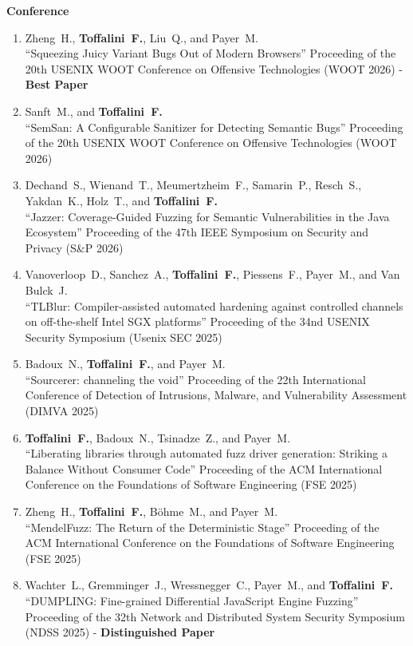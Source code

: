\textbf{Conference}\begin{enumerate}[leftmargin=5mm]
\item[C20] Zheng~H., \textbf{Toffalini~F.}, Liu~Q., and Payer~M.\\``Squeezing Juicy Variant Bugs Out of Modern Browsers'' Proceeding of the 20th USENIX WOOT Conference on Offensive Technologies (WOOT 2026)  - \textbf{Best Paper}
\item[C19] Sanft~M., and \textbf{Toffalini~F.}\\``SemSan: A Configurable Sanitizer for Detecting Semantic Bugs'' Proceeding of the 20th USENIX WOOT Conference on Offensive Technologies (WOOT 2026) 
\item[C18] Dechand~S., Wienand~T., Meumertzheim~F., Samarin~P., Resch~S., Yakdan~K., Holz~T., and \textbf{Toffalini~F.}\\``Jazzer: Coverage-Guided Fuzzing for Semantic Vulnerabilities in the Java Ecosystem'' Proceeding of the 47th IEEE Symposium on Security and Privacy (S\&P 2026) 
\item[C17] Vanoverloop~D., Sanchez~A., \textbf{Toffalini~F.}, Piessens~F., Payer~M., and Van Bulck~J.\\``TLBlur: Compiler-assisted automated hardening against controlled channels on off-the-shelf Intel SGX platforms'' Proceeding of the 34nd USENIX Security Symposium (Usenix SEC 2025) 
\item[C16] Badoux~N., \textbf{Toffalini~F.}, and Payer~M.\\``Sourcerer: channeling the void'' Proceeding of the 22th International Conference of Detection of Intrusions, Malware, and Vulnerability Assessment (DIMVA 2025) 
\item[C15] \textbf{Toffalini~F.}, Badoux~N., Tsinadze~Z., and Payer~M.\\``Liberating libraries through automated fuzz driver generation: Striking a Balance Without Consumer Code'' Proceeding of the ACM International Conference on the Foundations of Software Engineering (FSE 2025) 
\item[C14] Zheng~H., \textbf{Toffalini~F.}, Böhme~M., and Payer~M.\\``MendelFuzz: The Return of the Deterministic Stage'' Proceeding of the ACM International Conference on the Foundations of Software Engineering (FSE 2025) 
\item[C13] Wachter~L., Gremminger~J., Wressnegger~C., Payer~M., and \textbf{Toffalini~F.}\\``DUMPLING: Fine-grained Differential JavaScript Engine Fuzzing'' Proceeding of the 32th Network and Distributed System Security Symposium (NDSS 2025)  - \textbf{Distinguished Paper}

\end{enumerate}
